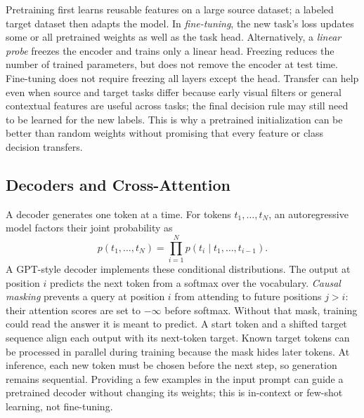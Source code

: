 Pretraining first learns reusable features on a large source dataset; a
labeled target dataset then adapts the model. In \emph{fine-tuning}, the new
task's loss updates some or all pretrained weights as well as the task head.
Alternatively, a \emph{linear probe} freezes the encoder and trains only a
linear head. Freezing reduces the number of trained parameters, but does not
remove the encoder at test time. Fine-tuning does not require freezing all
layers except the head. Transfer can help even when source and target tasks
differ because early visual filters or general contextual features are useful
across tasks; the final decision rule may still need to be learned for the new
labels. This is why a pretrained initialization can be better than random
weights without promising that every feature or class decision transfers.

\subsection{Decoders and Cross-Attention}

A decoder generates one token at a time. For tokens $t_1,\ldots,t_N$, an
autoregressive model factors their joint probability as
\begin{equation}
  p(t_1,\ldots,t_N)
  =\prod_{i=1}^{N}p(t_i\mid t_1,\ldots,t_{i-1}).
  \label{eq:transformer-autoregressive}
\end{equation}
\noindent
A GPT-style decoder implements these conditional distributions. The output at
position $i$ predicts the next token from a softmax over the vocabulary.
\emph{Causal masking} prevents a query at position $i$ from attending to
future positions $j>i$: their attention scores are set to $-\infty$ before
softmax. Without that mask, training could read the answer it is meant to
predict. A start token and a shifted target sequence align each output with
its next-token target. Known target tokens can be processed in parallel during
training because the mask hides later tokens. At inference, each new token
must be chosen before the next step, so generation remains sequential.
Providing a few examples in the input prompt can guide a pretrained decoder
without changing its weights; this is in-context or few-shot learning, not
fine-tuning.


